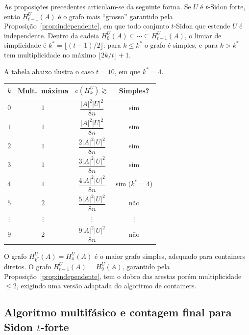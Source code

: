 \documentclass[reqno,a4paper,12pt]{amsart}
\begin{document}
As proposições precedentes articulam-se da seguinte forma. Se $U$ é $t$-Sidon forte, então
$H_{t-1}^U(A)$ é o grafo mais ``grosso'' garantido pela Proposição~\ref{prop:independente},
em que todo conjunto $t$-Sidon que estende $U$ é independente. Dentro da cadeia
$H_0^U(A) \subseteq \cdots \subseteq H_{t-1}^U(A)$, o limiar de simplicidade é
$k^* = \lfloor(t-1)/2\rfloor$: para $k \leq k^*$ o grafo é simples, e para $k > k^*$ tem
multiplicidade no máximo $\lfloor 2k/t\rfloor + 1$.

A tabela abaixo ilustra o caso $t = 10$, em que $k^* = 4$.

\begin{center}
  \renewcommand{\arraystretch}{1.5}
  \begin{tabular}{cccc}
    \hline
    $k$      & Mult.~máxima & $e(H_k^U) \gtrsim$        & Simples?      \\
    \hline
    $0$      & $1$          & $\dfrac{|A|^2|U|^2}{8n}$  & sim           \\
    $1$      & $1$          & $\dfrac{|A|^2|U|^2}{8n}$  & sim           \\
    $2$      & $1$          & $\dfrac{2|A|^2|U|^2}{8n}$ & sim           \\
    $3$      & $1$          & $\dfrac{3|A|^2|U|^2}{8n}$ & sim           \\
    $4$      & $1$          & $\dfrac{4|A|^2|U|^2}{8n}$ & sim ($k^*=4$) \\
    $5$      & $2$          & $\dfrac{5|A|^2|U|^2}{8n}$ & não           \\
    $\vdots$ & $\vdots$     & $\vdots$                  & $\vdots$      \\
    $9$      & $2$          & $\dfrac{9|A|^2|U|^2}{8n}$ & não           \\
    \hline
  \end{tabular}
\end{center}

O grafo $H_{k^*}^U(A) = H_4^U(A)$ é o maior grafo simples, adequado para containers
diretos. O grafo $H_{t-1}^U(A) = H_9^U(A)$, garantido pela Proposição~\ref{prop:independente},
tem o dobro das arestas porém multiplicidade $\leq 2$, exigindo uma versão adaptada
do algoritmo de containers.

\subsection{Algoritmo multifásico e contagem final para Sidon $t$-forte}
\end{document}
